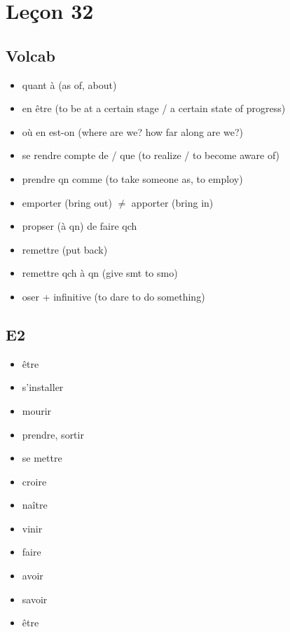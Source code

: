 \documentclass{book}
\begin{document}
\chapter{Leçon 32}    

    \section{Volcab}
        \begin{itemize}
            \item quant à (as of, about)
            \item en être (to be at a certain stage / a certain state of progress)
            \item où en est-on (where are we? how far along are we?)
            \item se rendre compte de / que (to realize / to become aware of)
            \item prendre qn comme (to take someone as, to employ)
            \item emporter (bring out) $\neq$ apporter (bring in)
            \item propser (à qn) de faire qch
            \item remettre (put back)
            \item remettre qch à qn (give smt to smo)
            \item oser + infinitive (to dare to do something)
        \end{itemize}

    \section{E2}
        \begin{itemize}
            \item être
            \item s'installer
            \item mourir
            \item prendre, sortir
            \item se mettre
            \item croire
            \item naître
            \item vinir
            \item faire
            \item avoir
            \item savoir
            \item être
        \end{itemize}
\end{document}
